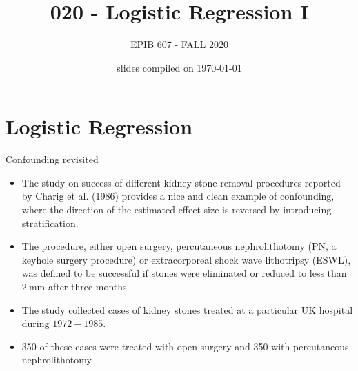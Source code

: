 \documentclass[10pt,handout]{beamer}\usepackage[]{graphicx}\usepackage[]{color}
\begin{document}
	
	
	
	
	\title{020 - Logistic Regression I}
	\author{EPIB 607 - FALL 2020}
	
	\date{slides compiled on \today}
	
	\maketitle
	
	


\section{Logistic Regression}

\begin{frame}{Confounding revisited}

\begin{itemize}
	\item The study on success of different kidney stone removal procedures reported by Charig et al. (1986) provides a nice and clean example of confounding, where the direction of the estimated effect size is reversed by introducing stratification.
\item The procedure, either open surgery, percutaneous nephrolithotomy (PN, a keyhole surgery procedure) or extracorporeal shock wave lithotripsy (ESWL), was defined to be successful if stones were eliminated or reduced to less than $2 \mathrm{~mm}$ after three months.
\item The study collected cases of kidney stones treated at a particular UK hospital during $1972-1985$.
\item 350 of these cases were treated with open surgery and 350 with percutaneous nephrolithotomy.
\end{itemize}
\end{frame}
\end{document}
